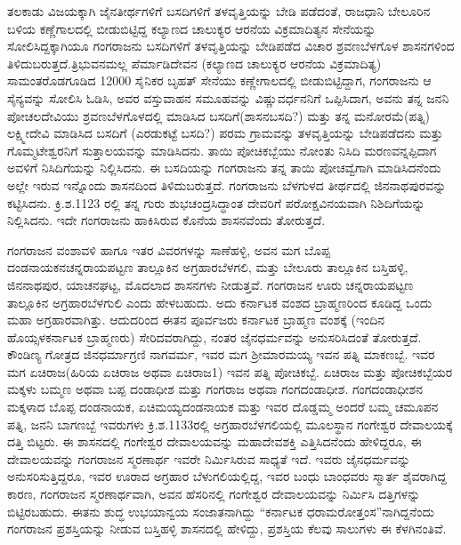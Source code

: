 ತಲಕಾಡು ವಿಜಯಕ್ಕಾಗಿ ಜೈನತೀರ್ಥಗಳಿಗೆ ಬಸದಿಗಳಿಗೆ ತಳವೃತ್ತಿಯನ್ನು ಬೇಡಿ ಪಡೆದಂತೆ, ರಾಜಧಾನಿ ಬೇಲೂರಿನ ಬಳಿಯ ಕಣ್ಣೆಗಾಲದಲ್ಲಿ ಬೀಡುಬಿಟ್ಟಿದ್ದ ಕಲ್ಯಾಣದ ಚಾಲುಕ್ಯರ ಆರನೆಯ ವಿಕ್ರಮಾದಿತ್ಯನ ಸೇನೆಯನ್ನು ಸೋಲಿಸಿದ್ದಕ್ಕಾಗಿಯೂ ಗಂಗರಾಜನು ಬಸದಿಗಳಿಗೆ ತಳವೃತ್ತಿಯನ್ನು ಬೇಡಿಪಡೆದ ವಿಚಾರ ಶ್ರವಣಬೆಳಗೊಳ ಶಾಸನಗಳಿಂದ ತಿಳಿದುಬರುತ್ತದೆ.\break ತ್ರಿಭುವನಮಲ್ಲ ಪೆರ್ಮಾಡಿದೇವನ (ಕಲ್ಯಾಣದ ಚಾಲುಕ್ಯರ ಆರನೆಯ ವಿಕ್ರಮಾದಿತ್ಯ) ಸಾಮಂತರೊಡಗೂಡಿದ 12000 ಸೈನಿಕರ ಬೃಹತ್​ ಸೇನೆಯು ಕಣ್ಣೇಗಾಲದಲ್ಲಿ ಬೀಡುಬಿಟ್ಟಿದ್ದಾಗ, ಗಂಗರಾಜನು ಆ ಸೈನ್ಯವನ್ನು ಸೋಲಿಸಿ ಓಡಿಸಿ, ಅವರ ವಸ್ತುವಾಹನ ಸಮೂಹವನ್ನು ವಿಷ್ಣುವರ್ಧನನಿಗೆ ಒಪ್ಪಿಸಿದಾಗ, ಅವನು ತನ್ನ ಜನನಿ ಪೋಚಲದೇವಿಯು ಶ್ರವಣಬೆಳಗೊಳದಲ್ಲಿ ಮಾಡಿಸಿದ ಬಸದಿಗೆ(ಶಾಸನಬಸದಿ?) ಮತ್ತು ತನ್ನ ಮನೋರಮೆ(ಪತ್ನಿ) ಲಕ್ಷ್ಮೀದೇವಿ ಮಾಡಿಸಿದ ಬಸದಿಗೆ (ಎರಡುಕಟ್ಟೆ ಬಸದಿ?) ಪರಮ ಗ್ರಾಮವನ್ನು ತಳವೃತ್ತಿಯನ್ನು ಬೇಡಿಪಡೆದನು ಮತ್ತು ಗೊಮ್ಮಟೇಶ್ವರನಿಗೆ ಸುತ್ತಾಲಯವನ್ನು ಮಾಡಿಸಿದನು. ತಾಯಿ ಪೋಚಿಕಬ್ಬೆಯು ನೋಂತು ನಿಸಿದಿ ಮರಣವನ್ನಪ್ಪಿದಾಗ ಅವಳಿಗೆ ನಿಸಿದಿಗೆಯನ್ನು ನಿಲ್ಲಿಸಿದನು. ಈ ಬಸದಿಯನ್ನು ಗಂಗರಾಜನು ತನ್ನ ತಾಯಿ ಪೋಚವ್ವೆಗಾಗಿ ಮಾಡಿಸಿದನೆಂದು ಅಲ್ಲೇ ಇರುವ ಇನ್ನೊಂದು ಶಾಸನದಿಂದ ತಿಳಿದುಬರುತ್ತದೆ. ಗಂಗರಾಜನು ಬೆಳಗುಳದ ತೀರ್ಥದಲ್ಲಿ ಜಿನನಾಥಪುರವನ್ನು ಕಟ್ಟಿಸಿದನು. ಕ್ರಿ.ಶ.1123 ರಲ್ಲಿ ತನ್ನ ಗುರು ಶುಭಚಂದ್ರಸಿದ್ಧಾಂತ ದೇವರಿಗೆ ಪರೋಕ್ಷವಿನಯವಾಗಿ ನಿಶಿದಿಗೆಯನ್ನು ನಿಲ್ಲಿಸಿದನು. ಇದೇ ಗಂಗರಾಜನು ಹಾಕಿಸಿರುವ ಕೊನೆಯ ಶಾಸನವೆಂದು ತೋರುತ್ತದೆ.

ಗಂಗರಾಜನ ವಂಶಾವಳಿ ಹಾಗೂ ಇತರ ವಿವರಗಳನ್ನು ಸಾಣೆಹಳ್ಳಿ, ಅವನ ಮಗ ಬೊಪ್ಪ ದಂಡನಾಯಕನ\break ಚನ್ನರಾಯಪಟ್ಟಣ ತಾಲ್ಲೂಕಿನ ಅಗ್ರಹಾರಬೆಳಗಲಿ, ಮತ್ತು ಬೇಲೂರು ತಾಲ್ಲೂಕಿನ ಬಸ್ತಿಹಳ್ಳಿ, ಜಿನನಾಥಪುರ, ಯಾಚನಘಟ್ಟ, ಮೊದಲಾದ ಶಾಸನಗಳು ನೀಡುತ್ತವೆ. ಗಂಗರಾಜನ ಊರು ಚನ್ನರಾಯಪಟ್ಟಣ ತಾಲ್ಲೂಕಿನ ಅಗ್ರಹಾರ\-ಬೆಳಗುಲಿ ಎಂದು ಹೇಳಬಹುದು. ಅದು ಕರ್ನಾಟಕ ವಂಶದ ಬ್ರಾಹ್ಮಣರಿಂದ ಕೂಡಿದ್ದ ಒಂದು ಮಹಾ ಅಗ್ರಹಾರವಾಗಿತ್ತು. ಆದುದರಿಂದ ಈತನ ಪೂರ್ವಜರು ಕರ್ನಾಟಕ ಬ್ರಾಹ್ಮಣ ವಂಶಕ್ಕೆ (ಇಂದಿನ ಹೊಯ್ಸಳಕರ್ನಾಟಕ ಬ್ರಾಹ್ಮಣರು) ಸೇರಿದವರಾಗಿದ್ದು, ನಂತರ ಜೈನಧರ್ಮವನ್ನು ಅನುಸರಿಸಿದಂತೆ ತೋರುತ್ತದೆ. ಕೌಂಡಿಣ್ಯ ಗೋತ್ರದ ಜಿನಧರ್ಮಾಗ್ರಣಿ ನಾಗವರ್ಮ, ಇವರ ಮಗ ಶ‍್ರೀಮಾರಮಯ್ಯ ಇವನ ಪತ್ನಿ ಮಾಕಣಬ್ಬೆ. ಇವರ ಮಗ ಏಚಿರಾಜ(ಹಿರಿಯ ಏಚಿರಾಜ ಅಥವಾ ಏಚಿರಾಜ\enginline{-}1) ಇವನ ಪತ್ನಿ ಪೋಚಿಕಬ್ಬೆ. ಏಚಿರಾಜ ಮತ್ತು ಪೋಚಿಕಬ್ಬೆಯರ ಮಕ್ಕಳು ಬಮ್ಮಣ ಅಥವಾ ಬಪ್ಪ ದಂಡಾಧೀಶ ಮತ್ತು ಗಂಗರಾಜ ಅಥವಾ ಗಂಗದಂಡಾಧೀಶ. ಗಂಗದಂಡಾಧೀಶನ ಮಕ್ಕಳಾದ ಬೊಪ್ಪ ದಂಡನಾಯಕ, ಏಚಿಮಯ್ಯದಂಡನಾಯಕ ಮತ್ತು ಇವರ ದೊಡ್ಡಮ್ಮ ಅಂದರೆ ಬಮ್ಮ ಚಮೂಪನ ಪತ್ನಿ, ಜನನಿ ಬಾಗಣಬ್ಬೆ ಇವರುಗಳು ಕ್ರಿ.ಶ.1133ರಲ್ಲಿ ಅಗ್ರಹಾರಬೆಳಗಲಿಯಲ್ಲಿ ಮೂಲಸ್ಥಾನ ಗಂಗೇಶ್ವರ ದೇವಾಲಯಕ್ಕೆ ದತ್ತಿ ಬಿಟ್ಟರು. ಈ ಶಾಸನದಲ್ಲಿ ಗಂಗೇಶ್ವರ ದೇವಾಲಯವನ್ನು ಮಹಾದೇವಶಕ್ತಿ ಎತ್ತಿಸಿದನೆಂದು ಹೇಳಿದ್ದರೂ, ಈ ದೇವಾಲಯವನ್ನು ಗಂಗರಾಜನ ಸ್ಮರಣಾರ್ಥ ಇವರೇ ನಿರ್ಮಿಸಿರುವ ಸಾಧ್ಯತೆ ಇದೆ. ಇವರು ಜೈನಧರ್ಮವನ್ನು ಅನುಸರಿಸುತ್ತಿದ್ದರೂ, ಇವರ ಊರಾದ ಅಗ್ರಹಾರ ಬೆಳುಗಲಿಯಲ್ಲಿದ್ದ, ಇವರ ಬಂಧು ಬಾಂಧವರು ಸ್ಮಾರ್ತ ಶೈವರಾಗಿದ್ದ ಕಾರಣ, ಗಂಗರಾಜನ ಸ್ಮರಣಾರ್ಥವಾಗಿ, ಅವನ ಹೆಸರಿನಲ್ಲಿ ಗಂಗೇಶ್ವರ ದೇವಾಲಯವನ್ನು ನಿರ್ಮಿಸಿ ದತ್ತಿಗಳನ್ನು ಬಿಟ್ಟಿರಬಹುದು. ಈತನು ಶುದ್ಧ ಉಭಯಾನ್ವಯ ಸಂಜಾತನಾಗಿದ್ದು “ಕರ್ನಾಟಕ ಧರಾಮರೋತ್ತಂಸ”ನಾಗಿದ್ದನೆಂದು ಗಂಗರಾಜನ ಪ್ರಶಸ್ತಿಯನ್ನು ನೀಡುವ ಬಸ್ತಿಹಳ್ಳಿ ಶಾಸನದಲ್ಲಿ ಹೇಳಿದ್ದು, ಪ್ರಶಸ್ತಿಯ ಕೆಲವು ಸಾಲುಗಳು ಈ ಕೆಳಗಿನಂತಿವೆ.

